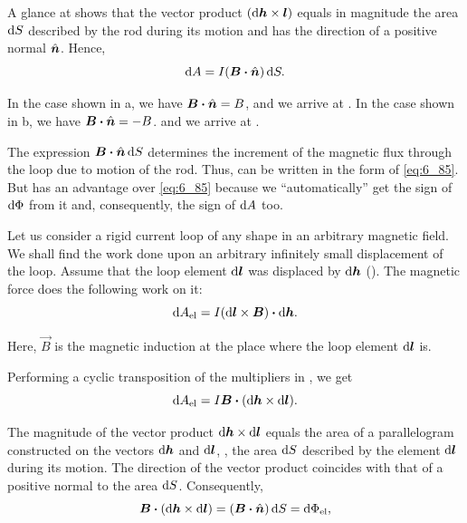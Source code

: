 A glance at  shows that the vector product $(\mathrm{d}\boldsymbol{h}\times\boldsymbol{l})$ equals in magnitude the area $\mathrm{d} S$ described by the rod during its motion and has the direction of a positive normal $\hat{\boldsymbol{n}}$. Hence,
\begin{equation}\label{eq:6_88}
    \mathrm{d} A = I (\boldsymbol{B} \boldsymbol{\cdot} \hat{\boldsymbol{n}})\, \mathrm{d} S.
\end{equation}

\noindent
In the case shown in a, we have $\boldsymbol{B}\boldsymbol{\cdot}\hat{\boldsymbol{n}}=B$, and we arrive at . In the case shown in b, we have $\boldsymbol{B}\boldsymbol{\cdot}\hat{\boldsymbol{n}}=-B$. and we arrive at .

The expression $\boldsymbol{B}\boldsymbol{\cdot}\hat{\boldsymbol{n}}\,\mathrm{d} S$ determines the increment of the magnetic flux through the loop due to motion of the rod. Thus,  can be written in the form of \eqref{eq:6_85}. But  has an advantage over \eqref{eq:6_85} because we ``automatically'' get the sign of $\mathrm{d}\Phi$ from it and, consequently, the sign of $\mathrm{d} A$ too.

Let us consider a rigid current loop of any shape in an arbitrary magnetic field. We shall find the work done upon an arbitrary infinitely small displacement of the loop. Assume that the loop element $\mathrm{d}\boldsymbol{l}$ was displaced by $\mathrm{d}\boldsymbol{h}$ (). The magnetic force does the following work on it:
\begin{equation}\label{eq:6_89}
    \mathrm{d}A_{\text{el}} = I (\mathrm{d}\boldsymbol{l} \times \boldsymbol{B}) \boldsymbol{\cdot} \mathrm{d}\boldsymbol{h}.
\end{equation}

\noindent
Here, $\vec{B}$ is the magnetic induction at the place where the loop element $\mathrm{d}\boldsymbol{l}$ is.

Performing a cyclic transposition of the multipliers in , we get
\begin{equation}\label{eq:6_90}
    \mathrm{d}A_{\text{el}} = I \boldsymbol{B} \boldsymbol{\cdot} (\mathrm{d}\boldsymbol{h} \times \mathrm{d}\boldsymbol{l}).
\end{equation}

\noindent
The magnitude of the vector product $\mathrm{d}\boldsymbol{h} \times\mathrm{d}\boldsymbol{l}$ equals the area of a parallelogram constructed on the vectors $\mathrm{d}\boldsymbol{h}$ and $\mathrm{d}\boldsymbol{l}$, \ie, the area $\mathrm{d} S$ described by the element $\mathrm{d}\boldsymbol{l}$ during its motion. The direction of the vector product coincides with that of a positive normal to the area $\mathrm{d} S$. Consequently,
\begin{equation}\label{eq:6_91}
    \boldsymbol{B} \boldsymbol{\cdot} (\mathrm{d}\boldsymbol{h} \times \mathrm{d}\boldsymbol{l}) = (\boldsymbol{B} \boldsymbol{\cdot} \hat{\boldsymbol{n}})\, \mathrm{d} S = \mathrm{d}\Phi_{\text{el}},
\end{equation}

